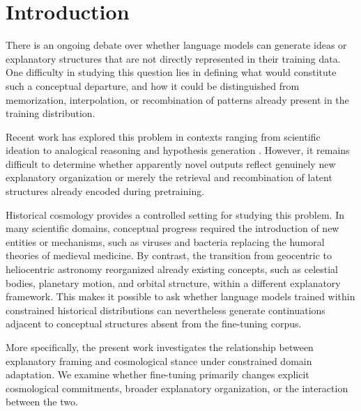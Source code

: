 \section{Introduction}

There is an ongoing debate over whether language models can generate ideas or explanatory structures that are not directly represented in their training data. One difficulty in studying this question lies in defining what would constitute such a conceptual departure, and how it could be distinguished from memorization, interpolation, or recombination of patterns already present in the training distribution.

Recent work has explored this problem in contexts ranging from scientific ideation to analogical reasoning and hypothesis generation \cite{si2024llmsgeneratenovelresearch,radensky2026humanllmcompoundscientificideation}. However, it remains difficult to determine whether apparently novel outputs reflect genuinely new explanatory organization or merely the retrieval and recombination of latent structures already encoded during pretraining. 

Historical cosmology provides a controlled setting for studying this problem. In many scientific domains, conceptual progress required the introduction of new entities or mechanisms, such as viruses and bacteria replacing the humoral theories of medieval medicine. By contrast, the transition from geocentric to heliocentric astronomy reorganized already existing concepts, such as celestial bodies, planetary motion, and orbital structure, within a different explanatory framework. This makes it possible to ask whether language models trained within constrained historical distributions can nevertheless generate continuations adjacent to conceptual structures absent from the fine-tuning corpus.

More specifically, the present work investigates the relationship between explanatory framing and cosmological stance under constrained domain adaptation. We examine whether fine-tuning primarily changes explicit cosmological commitments, broader explanatory organization, or the interaction between the two.

